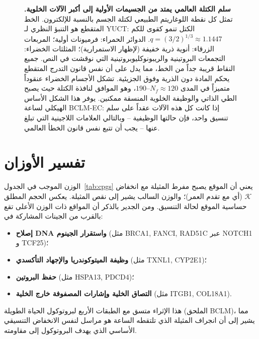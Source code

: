 \documentclass[11pt,a4paper]{article}
\newcommand{\REL}{\mathcal{K}}          %
\begin{document}
\begin{figure}[H]
		\caption{\textbf{سلم الكتلة العالمي يمتد من الجسيمات الأولية إلى أكبر الآلات الخلوية.} 
			تمثل كل نقطة اللوغاريتم الطبيعي لكتلة الجسم بالنسبة للإلكترون. 
			الخط المتقطع هو التنبؤ النظري لـ YUCT: الكتل تنمو كقوى للكم \(q = (3/2)^{1/3} \approx 1.1447\). 
			الدوائر الحمراء: فرميونات أولية؛ المربعات الزرقاء: أنوية ذرية خفيفة (لإظهار الاستمرارية)؛ المثلثات الخضراء: التجمعات البروتينية والريبونوكليوبروتينية التي نوقشت في النص. 
			جميع النقاط قريبة جداً من الخط، مما يدل على أن نفس قانون التدرج المتقطع يحكم المادة دون الذرية وفوق الجزيئية. 
			تشكل الأجسام الخضراء عنقوداً متميزاً في المدى \(N_f \approx 120\)–\(190\)، وهو الموافق لنافذة الكتلة حيث يصبح الطي الذاتي والوظيفة الخلوية المنسقة ممكنين. 
			يوفر هذا الشكل الأساس الهيكلي لساعة BCLM-EC: إذا كانت كل هذه الآلات عقداً على سلم تنسيق واحد، فإن حالتها الوظيفية – وبالتالي العلامات اللاجينية التي تبلغ عنها – يجب أن تتبع نفس قانون الخطأ العالمي.}
		\label{fig:mass_ladder_bclm}
	\end{figure}
	
	\section{تفسير الأوزان}
	\label{sec:weights}
	الوزن الموجب في الجدول~\ref{tab:cpgs} يعني أن الموقع يصبح مفرط المثيلة مع انخفاض \(\REL\) (أي مع تقدم العمر)؛ والوزن السالب يشير إلى نقص المثيلة. يعكس الحجم المطلق حساسية الموقع لحالة التنسيق. ومن الجدير بالذكر أن المواقع ذات الوزن الأعلى تقع بالقرب من الجينات المشاركة في:
	\begin{itemize}
		\item \textbf{إصلاح DNA واستقرار الجينوم} (مثل BRCA1, FANCI, RAD51C عبر NOTCH1 و TCF25)؛
		\item \textbf{وظيفة الميتوكوندريا والإجهاد التأكسدي} (مثل TXNL1, CYP2E1)؛
		\item \textbf{حفظ البروتين} (مثل HSPA13, PDCD4)؛
		\item \textbf{التصاق الخلية وإشارات المصفوفة خارج الخلية} (مثل ITGB1, COL18A1).
	\end{itemize}
	هذا الإثراء متسق مع الطبقات الأربع لبروتوكول الحياة الطويلة (الملحق BCLM)، مما يشير إلى أن انجراف المثيلة الذي تلتقطه الساعة هو مراسل لنفس الانخفاض التنسيقي الأساسي الذي يهدف البروتوكول إلى مقاومته.
	
\end{document}
